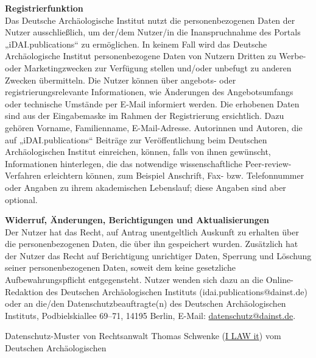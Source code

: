 {\textbf{Registrierfunktion}\\
Das Deutsche Archäologische Institut nutzt die personenbezogenen Daten der Nutzer ausschließlich, um der/dem Nutzer/in die Inanspruchnahme des Portals „iDAI.publications“ zu ermöglichen. In keinem Fall wird das Deutsche Archäologische Institut personenbezogene Daten von Nutzern Dritten zu Werbe- oder Marketingzwecken zur Verfügung stellen und/oder unbefugt zu anderen Zwecken übermitteln.
Die Nutzer können über angebots- oder registrierungsrelevante Informationen, wie Änderungen des Angebotsumfangs oder technische Umstände per E-Mail informiert werden. Die erhobenen Daten sind aus der Eingabemaske im Rahmen der Registrierung ersichtlich. Dazu gehören Vorname, Familienname, E-Mail-Adresse. Autorinnen und Autoren, die auf „iDAI.publications“ Beiträge zur Veröffentlichung beim Deutschen Archäologischen Institut einreichen, können, falls von ihnen gewünscht, Informationen hinterlegen, die das notwendige wissenschaftliche Peer-review-Verfahren erleichtern können, zum Beispiel Anschrift, Fax- bzw. Telefonnummer oder Angaben zu ihrem akademischen Lebenslauf; diese Angaben sind aber optional.

\textbf{Widerruf, Änderungen, Berichtigungen und Aktualisierungen}\\
Der Nutzer hat das Recht, auf Antrag unentgeltlich Auskunft zu erhalten über die personenbezogenen Daten, die über ihn gespeichert wurden. Zusätzlich hat der Nutzer das Recht auf Berichtigung unrichtiger Daten, Sperrung und Löschung seiner personenbezogenen Daten, soweit dem keine gesetzliche Aufbewahrungspflicht entgegensteht.
Nutzer wenden sich dazu an die Online-Redaktion des Deutschen Archäologischen Instituts (idai.publications@dainst.de) oder an die/den Datenschutzbeauftragte(n) des Deutschen Archäologischen Instituts, Podbielskiallee 69–71, 14195 Berlin, E-Mail: \href{mailto:datenschutz@dainst.de}{datenschutz@dainst.de}.

Datenschutz-Muster von Rechtsanwalt Thomas Schwenke (\href{http:/rechtsanwalt-schwenke.de/smmr-buch/datenschutz-muster-generator-fuer-webseiten-blogs-und-social-media/}{I LAW it}) vom Deutschen Archäologischen 
}

